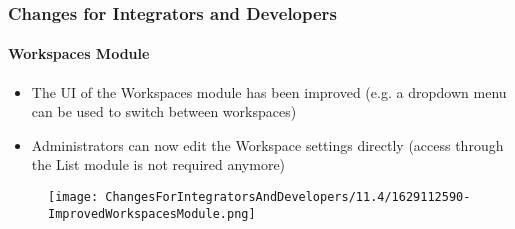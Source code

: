 %

\begin{frame}[fragile]
	\frametitle{Changes for Integrators and Developers}
	\framesubtitle{Workspaces Module}


	\begin{itemize}
		\item The UI of the Workspaces module has been improved\newline
			\small(e.g. a dropdown menu can be used to switch between workspaces)\normalsize
		\item Administrators can now edit the Workspace settings directly\newline
			\small(access through the List module is not required anymore)\normalsize
	\end{itemize}

	\begin{figure}
		\texttt{[image: ChangesForIntegratorsAndDevelopers/11.4/1629112590-ImprovedWorkspacesModule.png]}
	\end{figure}

\end{frame}

